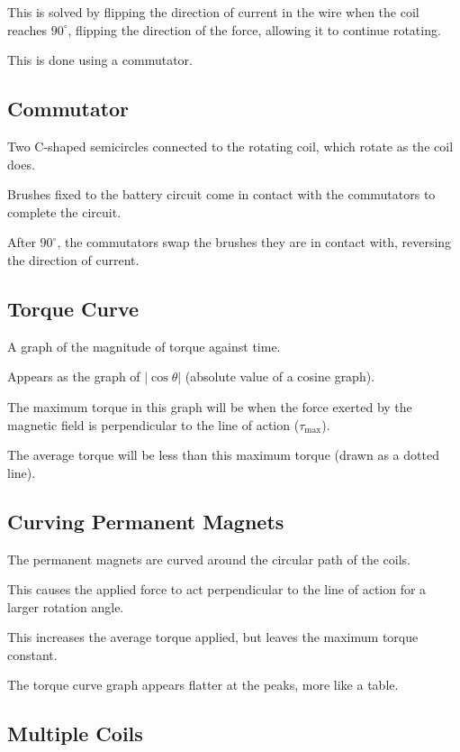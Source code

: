 \documentclass[a4paper,11pt]{article}
\begin{document}
This is solved by flipping the direction of current in the wire when the coil
reaches $90^\circ$, flipping the direction of the force, allowing it to
continue rotating.

This is done using a commutator.


\subsection{Commutator}

Two C-shaped semicircles connected to the rotating coil, which rotate as the
coil does.

Brushes fixed to the battery circuit come in contact with the commutators to
complete the circuit.

After $90^\circ$, the commutators swap the brushes they are in contact with,
reversing the direction of current.


\subsection{Torque Curve}

A graph of the magnitude of torque against time.

Appears as the graph of $\lvert \cos{\theta} \rvert$ (absolute value of a
cosine graph).

The maximum torque in this graph will be when the force exerted by the magnetic
field is perpendicular to the line of action ($\tau_{\text{max}}$).

The average torque will be less than this maximum torque (drawn as a dotted
line).


\subsection{Curving Permanent Magnets}

The permanent magnets are curved around the circular path of the coils.

This causes the applied force to act perpendicular to the line of action for
a larger rotation angle.

This increases the average torque applied, but leaves the maximum torque
constant.

The torque curve graph appears flatter at the peaks, more like a table.


\subsection{Multiple Coils}
\end{document}

